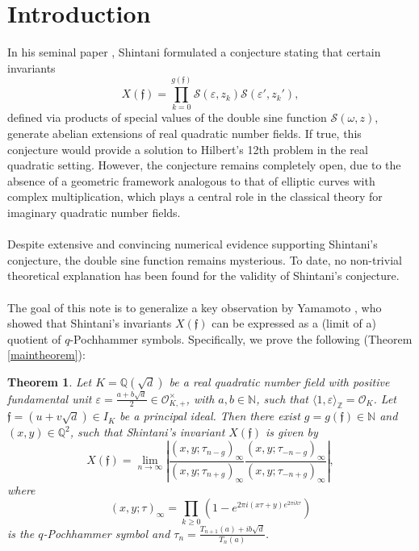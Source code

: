 \documentclass[11pt, a4paper]{amsart}
\newcommand{\ep}{\varepsilon}
\newcommand{\eq}[1]{\begin{equation}#1\end{equation}}
\theoremstyle{plain}
\newtheorem{theorem}{Theorem}[section]
\numberwithin{equation}{section}
\begin{document}
\section{Introduction}
\noindent
In his seminal paper \cite{Shintani1977}, Shintani formulated a conjecture stating that certain invariants \eq{X(\mathfrak f) = \prod_{k=0}^{g(\mathfrak f)} \mathcal S(\ep,z_k)\mathcal S(\ep',z_k'),} defined via products of special values of the double sine function $\mathcal S(\omega,z)$, generate abelian extensions of real quadratic number fields. If true, this conjecture would provide a solution to Hilbert's 12th problem in the real quadratic setting. However, the conjecture remains completely open, due to the absence of a geometric framework analogous to that of elliptic curves with complex multiplication, which plays a central role in the classical theory for imaginary quadratic number fields. \\ \\
Despite extensive and convincing numerical evidence supporting Shintani’s conjecture, the double sine function remains mysterious. To date, no non-trivial theoretical explanation has been found for the validity of Shintani's conjecture. \\ \\
The goal of this note is to generalize a key observation by Yamamoto \cite{yamamoto2010factorization}, who showed that Shintani’s invariants $X(\mathfrak f)$ can be expressed as a (limit of a) quotient of $q$-Pochhammer symbols. Specifically, we prove the following (Theorem \ref{maintheorem}):
\begin{theorem}
Let $K=\mathbb Q(\sqrt{d})$ be a real quadratic number field with positive fundamental unit $\ep = \frac{a+b\sqrt{d}}{2} \in \mathcal O_{K,+}^\times$, with $a,b \in \mathbb N$, such that $\langle 1,\varepsilon \rangle_\mathbb Z = \mathcal O _K$. Let $\mathfrak f = (u+v\sqrt{d}) \in I_K$ be a principal ideal. Then there exist $g = g(\mathfrak f) \in \mathbb N$ and $(x,y) \in \mathbb Q ^2$, such that Shintani's invariant $X(\mathfrak f)$ is given by \eq{\label{expression}X(\mathfrak f) = \lim_{n\to \infty}\left\vert \frac{(x,y;\tau_{n-g})_\infty}{(x,y;\tau_{n+g})_\infty} \frac{(x,y;\tau_{-n-g})_\infty}{(x,y;\tau_{-n+g})_\infty} \right\vert,}
where \eq{(x,y;\tau)_\infty = \prod_{k\geq 0}(1-e^{2 \pi i (x\tau+y) e^{2 \pi i k \tau}})} is the $q$-Pochhammer symbol and $\tau_n = \frac{T_{n+1}(a)+i b \sqrt{d}}{T_n(a)}$.
\end{theorem}
\end{document}
